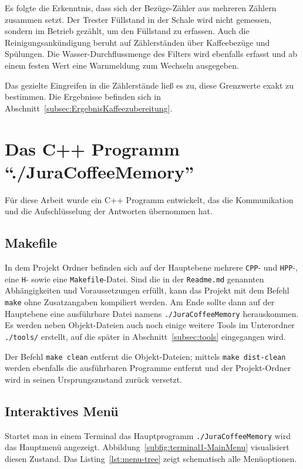 Es folgte die Erkenntnis, dass sich der Bezüge-Zähler aus mehreren Zählern zusammen setzt.
Der Trester Füllstand in der Schale wird nicht gemessen, sondern im Betrieb gezählt, um den Füllstand zu erfassen.
Auch die Reinigungsankündigung beruht auf Zählerständen über Kaffeebezüge und Spülungen.
Die Wasser-Durchflussmenge des Filters wird ebenfalls erfasst und ab einem festen Wert eine Warnmeldung zum Wechseln ausgegeben.

Das gezielte Eingreifen in die Zählerstände ließ es zu, diese Grenzwerte exakt zu bestimmen.
Die Ergebnisse befinden sich in Abschnitt~\ref{subsec:ErgebnisKaffeezubereitung}.

\section{Das C++ Programm "`./JuraCoffeeMemory"'}
Für diese Arbeit wurde ein C++ Programm entwickelt, das die Kommunikation und die Aufschlüsselung der Antworten übernommen hat.

\subsection{Makefile}
In dem Projekt Ordner befinden sich auf der Hauptebene mehrere \texttt{CPP}- und \texttt{HPP}-, eine \texttt{H}- sowie eine \texttt{Makefile}-Datei.
Sind die in der \texttt{Readme.md} genannten Abhängigkeiten und Voraussetzungen erfüllt, kann das Projekt mit dem Befehl \texttt{make} ohne Zusatzangaben kompiliert werden.
Am Ende sollte dann auf der Hauptebene eine ausführbare Datei namens \texttt{./JuraCoffeeMemory} herauskommen.
Es werden neben Objekt-Dateien auch noch einige weitere Tools im Unterordner \texttt{./tools/} erstellt, auf die später in Abschnitt~\ref{subsec:tools} eingegangen wird.

Der Befehl \texttt{make clean} entfernt die Objekt-Dateien; mittels \texttt{make dist-clean} werden ebenfalls die ausführbaren Programme entfernt und der Projekt-Ordner wird in seinen Ursprungszustand zurück versetzt.

\subsection{Interaktives Menü}
Startet man in einem Terminal das Hauptprogramm \texttt{./JuraCoffeeMemory} wird das Hauptmenü angezeigt. Abbildung~\ref{subfig:terminal1-MainMenu} visualisiert diesen Zustand.
Das Listing~\ref{lst:menu-tree} zeigt schematisch alle Menüoptionen.

